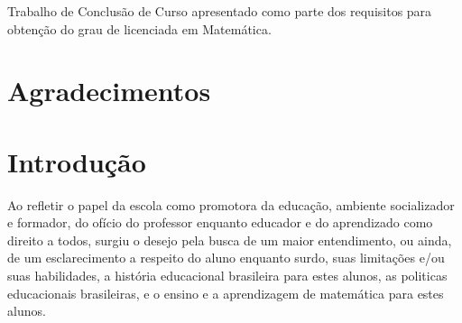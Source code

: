\documentclass[brasil]{abnt}
\begin{document}

\capa
\folhaderosto

\begin{folhadeaprovacao}
    Trabalho de Conclusão de Curso apresentado como parte dos requisitos para obtenção do grau de licenciada em Matemática.

\setlength{\ABNTsignthickness}{0.4pt}


\end{folhadeaprovacao}

\tableofcontents

\chapter*{Agradecimentos}


\begin{resumo}

\end{resumo}

\chapter*{Introdução}
	
	Ao refletir o papel da escola como promotora da educação, ambiente socializador e formador, do ofício do professor enquanto educador e do aprendizado como direito a todos, surgiu o desejo pela busca 
	de um maior entendimento, ou ainda, de um esclarecimento a respeito do aluno enquanto surdo, suas limitações e/ou suas habilidades, a história educacional brasileira para estes alunos, as politicas 
	educacionais brasileiras, e o ensino e a aprendizagem de matemática para estes alunos.  
		
\end{document}
